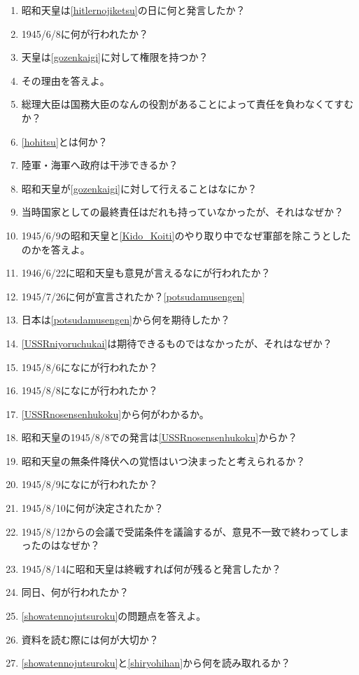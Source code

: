\documentclass[]{jsarticle}
\begin{document}
\begin{enumerate}
	\item 昭和天皇は\ref{hitlernojiketsu}の日に何と発言したか？
	\item 1945/6/8に何が行われたか？\label{gozenkaigi}
	\item 天皇は\ref{gozenkaigi}に対して権限を持つか？
	\item その理由を答えよ。
	\item 総理大臣は国務大臣のなんの役割があることによって責任を負わなくてすむか？\label{hohitsu}
	\item \ref{hohitsu}とは何か？
	\\
	\item 陸軍・海軍へ政府は干渉できるか？
	\item 昭和天皇が\ref{gozenkaigi}に対して行えることはなにか？
	\item 当時国家としての最終責任はだれも持っていなかったが、それはなぜか？
	\item 1945/6/9の昭和天皇と\ref{Kido_Koiti}のやり取り中でなぜ軍部を除こうとしたのかを答えよ。
	\item 1946/6/22に昭和天皇も意見が言えるなにが行われたか？
	\item 1945/7/26に何が宣言されたか？\ref{potsudamusengen}
	\item 日本は\ref{potsudamusengen}から何を期待したか？\label{USSRniyoruchukai}
	\item \ref{USSRniyoruchukai}は期待できるものではなかったが、それはなぜか？
	\item 1945/8/6になにが行われたか？
	\item 1945/8/8になにが行われたか？\label{USSRnosensenhukoku}
	\item \ref{USSRnosensenhukoku}から何がわかるか。
	\item 昭和天皇の1945/8/8での発言は\ref{USSRnosensenhukoku}からか？
	\item 昭和天皇の無条件降伏への覚悟はいつ決まったと考えられるか？
	\item 1945/8/9になにが行われたか？
	\item 1945/8/10に何が決定されたか？
	\item 1945/8/12からの会議で受諾条件を議論するが、意見不一致で終わってしまったのはなぜか？
	\item 1945/8/14に昭和天皇は終戦すれば何が残ると発言したか？
	\item 同日、何が行われたか？
	\\
	\item \ref{showatennojutsuroku}の問題点を答えよ。
	\item 資料を読む際には何が大切か？\label{shiryohihan}
	\item \ref{showatennojutsuroku}と\ref{shiryohihan}から何を読み取れるか？
\end{enumerate}
\end{document}
